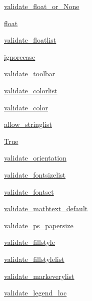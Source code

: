\begin{DoxyCompactItemize}
\hyperlink{namespacematplotlib_1_1rcsetup_a6dc869deda24c4ed0fedfc70ba0c1dd7}{validate\+\_\+float\+\_\+or\+\_\+\+None}
\item 
\hyperlink{namespacematplotlib_1_1rcsetup_aa128328ec7dfe9ae1b522b1a2f5d55cd}{float}
\item 
\hyperlink{namespacematplotlib_1_1rcsetup_a1b58303f8f22e2c25bbff2c42d72aa3a}{validate\+\_\+floatlist}
\item 
\hyperlink{namespacematplotlib_1_1rcsetup_ae02827062a7543df00a92b77565a1486}{ignorecase}
\item 
\hyperlink{namespacematplotlib_1_1rcsetup_a6f5979d3829ba197863a537509932304}{validate\+\_\+toolbar}
\item 
\hyperlink{namespacematplotlib_1_1rcsetup_a756efaaac29838326098a7aad6f6da77}{validate\+\_\+colorlist}
\item 
\hyperlink{namespacematplotlib_1_1rcsetup_a61b65ff7b138110761669a417d3c1b30}{validate\+\_\+color}
\item 
\hyperlink{namespacematplotlib_1_1rcsetup_a422156ff269b3a11a78999271df4828c}{allow\+\_\+stringlist}
\item 
\hyperlink{namespacematplotlib_1_1rcsetup_abab51e0b14a52cc38c5942d7c08766cc}{True}
\item 
\hyperlink{namespacematplotlib_1_1rcsetup_aed45d445c02e49e7465404aa24fe343d}{validate\+\_\+orientation}
\item 
\hyperlink{namespacematplotlib_1_1rcsetup_a31302f4777ffefca16b20352bf476544}{validate\+\_\+fontsizelist}
\item 
\hyperlink{namespacematplotlib_1_1rcsetup_a50601e5e18aced03e88136343e38e5bd}{validate\+\_\+fontset}
\item 
\hyperlink{namespacematplotlib_1_1rcsetup_afb8c39516d43aad0ac7594db28e75e7e}{validate\+\_\+mathtext\+\_\+default}
\item 
\hyperlink{namespacematplotlib_1_1rcsetup_a2af49775a1244ad0b8dd463973850750}{validate\+\_\+ps\+\_\+papersize}
\item 
\hyperlink{namespacematplotlib_1_1rcsetup_abe404f7e2235b04283c5e5ed9929ce31}{validate\+\_\+fillstyle}
\item 
\hyperlink{namespacematplotlib_1_1rcsetup_a9f45bfa0438012d37c997a68f8de3343}{validate\+\_\+fillstylelist}
\item 
\hyperlink{namespacematplotlib_1_1rcsetup_a49f3c458771a56e17032dd238ecebaf5}{validate\+\_\+markeverylist}
\item 
\hyperlink{namespacematplotlib_1_1rcsetup_a409060e4a0560dd026b4894fd4b3733e}{validate\+\_\+legend\+\_\+loc}

\end{DoxyCompactItemize}
